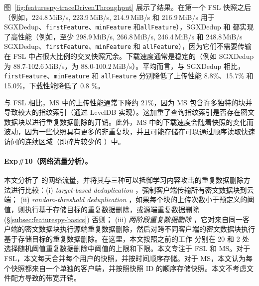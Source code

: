 图~\ref{fig:featurespy-traceDrivenThroughput} 展示了结果。在第一个 FSL 快照之后（例如，224.8\,MiB/s, 223.9\,MiB/s, 214.9\,MiB/s 和 216.9\,MiB/s 用于 SGXDedup、{\tt firstFeature}、{\tt minFeature} 和{\tt allFeature}），SGXDedup 和 \prototype 都实现了高性能（例如，至少 298.9\,MiB/s, 266.8\,MiB/s, 246.4\,MiB/s 和 248.8\,MiB/s SGXDedup、{\tt firstFeature}、{\tt minFeature} 和 {\tt allFeature}），因为它们不需要传输在 FSL 中占很大比例的交叉快照冗余。下载速度通常是稳定的（例如 SGXDedup 为 88.7-102.6\,MiB/s，\prototype 为 88.0-100.2\,MiB/s）。平均而言，与 SGXDedup 相比，{\tt firstFeature}、{\tt minFeature} 和 {\tt allFeature} 分别降低了上传性能 8.8\%、15.7\% 和 15.0\%，下载性能降低了 0.8 \%。

与 FSL 相比，MS 中的上传性能通常下降约 21\%，因为 MS 包含许多独特的块并导致较大的指纹索引（通过 LevelDB \cite{leveldb} 实现）。这加重了查询指纹索引是否存在密文数据块以进行重复数据删除的开销。此外，MS 中的下载速度会随着快照的变化而波动，因为一些快照具有更多的非重复块，并且可能存储在可以通过顺序读取快速访问的连续区域（即碎片较少的 \cite{lillibridge13}）中。


\paragraph*{Exp\#10（网络流量分析）。}
本文分析了 \prototype 的网络流量，并将其与三种可以抵御学习内容攻击的重复数据删除方法进行比较：(i) {\em target-based deduplication} \cite{harnik2010side}，强制客户端传输所有密文数据块到云端； (ii) {\em random-threshold deduplication} \cite{harnik2010side}，如果每个块的上传次数小于预定义的阈值，则执行基于存储目标的重复数据删除，或源端重复数据删除 (\S\ref{subsec:featurespy-basics}) 否则； (iii) {\em 两阶段重复数据删除} \cite{li15}，它对来自同一客户端的密文数据块执行源端重复数据删除，然后对跨不同客户端的密文数据块执行基于存储目标的重复数据删除。在这里，本文按照之前的工作 \cite{harnik2010side} 分别在 20 和 2 处选择随机阈值重复数据删除中阈值的上限和下限。本文专注于 FSL 和 MS。对于 FSL，本文每天合并每个用户的快照，并按时间顺序存储。对于 MS，本文认为每个快照都来自一个单独的客户端，并按照快照 ID 的顺序存储快照。本文不考虑文件配方导致的带宽开销。

